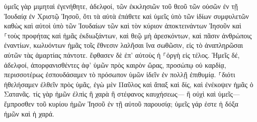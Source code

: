 \documentclass{openreader}
\begin{document}
ὑμεῖς γὰρ μιμηταὶ ἐγενήθητε, ἀδελφοί, τῶν ἐκκλησιῶν τοῦ θεοῦ τῶν οὐσῶν ἐν τῇ Ἰουδαίᾳ ἐν Χριστῷ Ἰησοῦ, ὅτι τὰ αὐτὰ ἐπάθετε καὶ ὑμεῖς ὑπὸ τῶν ἰδίων συμφυλετῶν καθὼς καὶ αὐτοὶ ὑπὸ τῶν Ἰουδαίων 
τῶν καὶ τὸν κύριον ἀποκτεινάντων Ἰησοῦν καὶ ⸀τοὺς προφήτας καὶ ἡμᾶς ἐκδιωξάντων, καὶ θεῷ μὴ ἀρεσκόντων, καὶ πᾶσιν ἀνθρώποις ἐναντίων, 
κωλυόντων ἡμᾶς τοῖς ἔθνεσιν λαλῆσαι ἵνα σωθῶσιν, εἰς τὸ ἀναπληρῶσαι αὐτῶν τὰς ἁμαρτίας πάντοτε. ἔφθασεν δὲ ἐπ’ αὐτοὺς ἡ ⸀ὀργὴ εἰς τέλος. 
Ἡμεῖς δέ, ἀδελφοί, ἀπορφανισθέντες ἀφ’ ὑμῶν πρὸς καιρὸν ὥρας, προσώπῳ οὐ καρδίᾳ, περισσοτέρως ἐσπουδάσαμεν τὸ πρόσωπον ὑμῶν ἰδεῖν ἐν πολλῇ ἐπιθυμίᾳ. 
⸀διότι ἠθελήσαμεν ἐλθεῖν πρὸς ὑμᾶς, ἐγὼ μὲν Παῦλος καὶ ἅπαξ καὶ δίς, καὶ ἐνέκοψεν ἡμᾶς ὁ Σατανᾶς. 
τίς γὰρ ἡμῶν ἐλπὶς ἢ χαρὰ ἢ στέφανος καυχήσεως— ἢ οὐχὶ καὶ ὑμεῖς— ἔμπροσθεν τοῦ κυρίου ἡμῶν Ἰησοῦ ἐν τῇ αὐτοῦ παρουσίᾳ; 
ὑμεῖς γάρ ἐστε ἡ δόξα ἡμῶν καὶ ἡ χαρά. 
\end{document}
